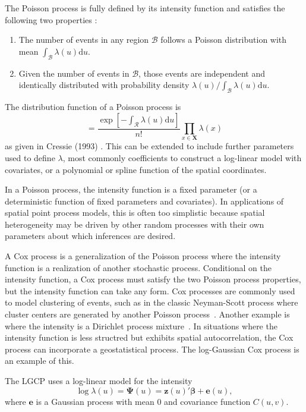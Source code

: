 \documentclass[]{interact}
\begin{document}
The Poisson process is fully defined by its intensity function and satisfies
the following two properties \cite{moellerwaagepetersen}:
\begin{enumerate}
\item The number of events in any region \(\mathcal{B}\) follows a Poisson
distribution with mean
\(\int_{\mathcal{B}} \lambda(u)\mathrm{d}u\).
\item Given the number of events in \(\mathcal{B}\), those events are
independent and identically distributed with probability density
\(\lambda(u) / \int_{\mathcal{B}} \lambda(u)\mathrm{d}u\).
\end{enumerate}
The distribution function of a Poisson process is
\begin{displaymath}
[\mathbf{X}|\lambda]
= \frac{\exp\left[-\int_{\mathcal{R}} \lambda(u) \mathrm{d}u\right]}
{n!} \prod_{x \in \mathbf{X}} \lambda(x)
\end{displaymath}
as given in Cressie (1993) \cite{cressie}. This can be extended to include
further parameters used to define \(\lambda\), most commonly coefficients
to construct a log-linear model with covariates, or a polynomial or spline
function of the spatial coordinates.

In a Poisson process, the intensity function is a fixed parameter (or a
deterministic function of fixed parameters and covariates). In applications of
spatial point process models, this is often too simplistic because spatial
heterogeneity may be driven by other random processes with their own parameters
about which inferences are desired.

A Cox process is a generalization of the Poisson process where the intensity
function is a realization of another stochastic process. Conditional on the
intensity function, a Cox process must satisfy the two Poisson process
properties, but the intensity function can take any form. Cox processes are
commonly used to model clustering of events, such as in the classic
Neyman-Scott process where cluster centers are generated by another Poisson
process~\cite{neymanscott}. Another example is where the intensity is a
Dirichlet process mixture~\cite{taddy}. In situations where the intensity
function is less structred but exhibits spatial autocorrelation, the Cox
process can incorporate a geostatistical process. The log-Gaussian Cox process
is an example of this.

The LGCP uses a log-linear model for the intensity
\begin{displaymath}
\log\lambda(u) = \boldsymbol{\Psi}(u)
= \mathbf{z}(u)' \boldsymbol{\beta} + \mathbf{e}(u),
\end{displaymath}
where \(\mathbf{e}\) is a Gaussian process with mean 0 and covariance function
\(C(u, v)\).
\end{document}
